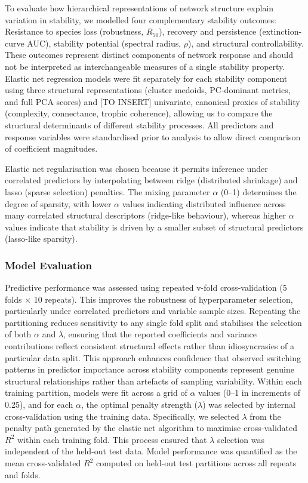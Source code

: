 \documentclass[
]{article}
\begin{document}
To evaluate how hierarchical representations of network structure
explain variation in stability, we modelled four complementary stability
outcomes: Resistance to species loss (robustness, \(R_{50}\)), recovery
and persistence (extinction-curve AUC), stability potential (spectral
radius, \(\rho\)), and structural controllability. These outcomes
represent distinct components of network response and should not be
interpreted as interchangeable measures of a single stability property.
Elastic net regression models were fit separately for each stability
component using three structural representations (cluster medoids,
PC-dominant metrics, and full PCA scores) and {[}TO INSERT{]}
univariate, canonical proxies of stability (complexity, connectance,
trophic coherence), allowing us to compare the structural determinants
of different stability processes. All predictors and response variables
were standardised prior to analysis to allow direct comparison of
coefficient magnitudes.

Elastic net regularisation was chosen because it permits inference under
correlated predictors by interpolating between ridge (distributed
shrinkage) and lasso (sparse selection) penalties. The mixing parameter
\(\alpha\) (0--1) determines the degree of sparsity, with lower
\(\alpha\) values indicating distributed influence across many
correlated structural descriptors (ridge-like behaviour), whereas higher
\(\alpha\) values indicate that stability is driven by a smaller subset
of structural predictors (lasso-like sparsity).

\subsubsection{Model Evaluation}\label{model-evaluation}

Predictive performance was assessed using repeated v-fold
cross-validation (5 folds × 10 repeats). This improves the robustness of
hyperparameter selection, particularly under correlated predictors and
variable sample sizes. Repeating the partitioning reduces sensitivity to
any single fold split and stabilises the selection of both \(\alpha\)
and \(\lambda\), ensuring that the reported coefficients and variance
contributions reflect consistent structural effects rather than
idiosyncrasies of a particular data split. This approach enhances
confidence that observed switching patterns in predictor importance
across stability components represent genuine structural relationships
rather than artefacts of sampling variability. Within each training
partition, models were fit across a grid of \(\alpha\) values (0--1 in
increments of 0.25), and for each \(\alpha\), the optimal penalty
strength (\(\lambda\)) was selected by internal cross-validation using
the training data. Specifically, we selected \(\lambda\) from the
penalty path generated by the elastic net algorithm to maximise
cross-validated \(R^2\) within each training fold. This process ensured
that \(\lambda\) selection was independent of the held-out test data.
Model performance was quantified as the mean cross-validated \(R^2\)
computed on held-out test partitions across all repeats and folds.
\end{document}
